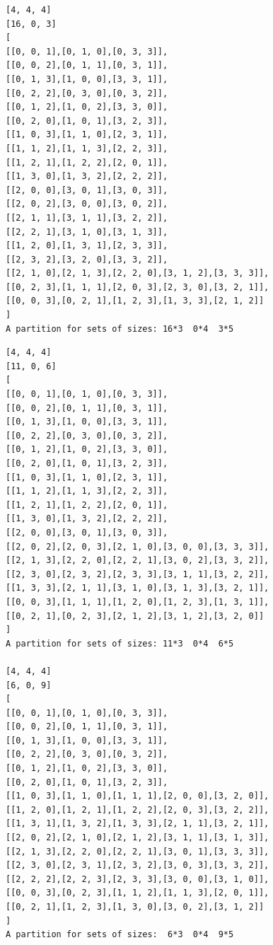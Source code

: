 \documentclass[final]{dmtcs-episciences}
\begin{document}
\begin{appendices}
\begin{verbatim}
[4, 4, 4]
[16, 0, 3]
[
[[0, 0, 1],[0, 1, 0],[0, 3, 3]],
[[0, 0, 2],[0, 1, 1],[0, 3, 1]],
[[0, 1, 3],[1, 0, 0],[3, 3, 1]],
[[0, 2, 2],[0, 3, 0],[0, 3, 2]],
[[0, 1, 2],[1, 0, 2],[3, 3, 0]],
[[0, 2, 0],[1, 0, 1],[3, 2, 3]],
[[1, 0, 3],[1, 1, 0],[2, 3, 1]],
[[1, 1, 2],[1, 1, 3],[2, 2, 3]],
[[1, 2, 1],[1, 2, 2],[2, 0, 1]],
[[1, 3, 0],[1, 3, 2],[2, 2, 2]],
[[2, 0, 0],[3, 0, 1],[3, 0, 3]],
[[2, 0, 2],[3, 0, 0],[3, 0, 2]],
[[2, 1, 1],[3, 1, 1],[3, 2, 2]],
[[2, 2, 1],[3, 1, 0],[3, 1, 3]],
[[1, 2, 0],[1, 3, 1],[2, 3, 3]],
[[2, 3, 2],[3, 2, 0],[3, 3, 2]],
[[2, 1, 0],[2, 1, 3],[2, 2, 0],[3, 1, 2],[3, 3, 3]],
[[0, 2, 3],[1, 1, 1],[2, 0, 3],[2, 3, 0],[3, 2, 1]],
[[0, 0, 3],[0, 2, 1],[1, 2, 3],[1, 3, 3],[2, 1, 2]]
]
A partition for sets of sizes: 16*3  0*4  3*5
\end{verbatim}

\newpage

\begin{verbatim} 
[4, 4, 4]
[11, 0, 6]
[
[[0, 0, 1],[0, 1, 0],[0, 3, 3]],
[[0, 0, 2],[0, 1, 1],[0, 3, 1]],
[[0, 1, 3],[1, 0, 0],[3, 3, 1]],
[[0, 2, 2],[0, 3, 0],[0, 3, 2]],
[[0, 1, 2],[1, 0, 2],[3, 3, 0]],
[[0, 2, 0],[1, 0, 1],[3, 2, 3]],
[[1, 0, 3],[1, 1, 0],[2, 3, 1]],
[[1, 1, 2],[1, 1, 3],[2, 2, 3]],
[[1, 2, 1],[1, 2, 2],[2, 0, 1]],
[[1, 3, 0],[1, 3, 2],[2, 2, 2]],
[[2, 0, 0],[3, 0, 1],[3, 0, 3]],
[[2, 0, 2],[2, 0, 3],[2, 1, 0],[3, 0, 0],[3, 3, 3]],
[[2, 1, 3],[2, 2, 0],[2, 2, 1],[3, 0, 2],[3, 3, 2]],
[[2, 3, 0],[2, 3, 2],[2, 3, 3],[3, 1, 1],[3, 2, 2]],
[[1, 3, 3],[2, 1, 1],[3, 1, 0],[3, 1, 3],[3, 2, 1]],
[[0, 0, 3],[1, 1, 1],[1, 2, 0],[1, 2, 3],[1, 3, 1]],
[[0, 2, 1],[0, 2, 3],[2, 1, 2],[3, 1, 2],[3, 2, 0]]
]
A partition for sets of sizes: 11*3  0*4  6*5

[4, 4, 4]
[6, 0, 9]
[
[[0, 0, 1],[0, 1, 0],[0, 3, 3]],
[[0, 0, 2],[0, 1, 1],[0, 3, 1]],
[[0, 1, 3],[1, 0, 0],[3, 3, 1]],
[[0, 2, 2],[0, 3, 0],[0, 3, 2]],
[[0, 1, 2],[1, 0, 2],[3, 3, 0]],
[[0, 2, 0],[1, 0, 1],[3, 2, 3]],
[[1, 0, 3],[1, 1, 0],[1, 1, 1],[2, 0, 0],[3, 2, 0]],
[[1, 2, 0],[1, 2, 1],[1, 2, 2],[2, 0, 3],[3, 2, 2]],
[[1, 3, 1],[1, 3, 2],[1, 3, 3],[2, 1, 1],[3, 2, 1]],
[[2, 0, 2],[2, 1, 0],[2, 1, 2],[3, 1, 1],[3, 1, 3]],
[[2, 1, 3],[2, 2, 0],[2, 2, 1],[3, 0, 1],[3, 3, 3]],
[[2, 3, 0],[2, 3, 1],[2, 3, 2],[3, 0, 3],[3, 3, 2]],
[[2, 2, 2],[2, 2, 3],[2, 3, 3],[3, 0, 0],[3, 1, 0]],
[[0, 0, 3],[0, 2, 3],[1, 1, 2],[1, 1, 3],[2, 0, 1]],
[[0, 2, 1],[1, 2, 3],[1, 3, 0],[3, 0, 2],[3, 1, 2]]
]
A partition for sets of sizes:  6*3  0*4  9*5


\end{verbatim}
\end{appendices}
\end{document}
